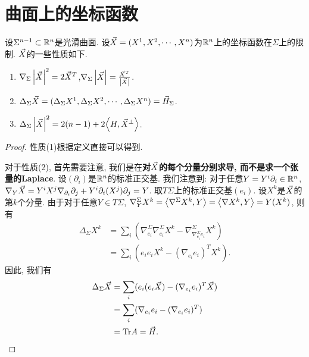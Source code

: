 \section{曲面上的坐标函数}
设$\Sigma^{n-1} \subset \mathbb{R}^n$是光滑曲面. 设${\vec{X}}=(X^1,X^2,\cdots,X^n)$为$\mathbb{R}^n$上的坐标函数在$\Sigma$上的限制. ${\vec{X}}$的一些性质如下.
\begin{enumerate}
    \item $\nabla_\Sigma \left | {\vec{X}} \right |^2=2{\vec{X}}^T$,$\nabla_\Sigma \left | {\vec{X}} \right |=\frac{{\vec{X}}^T}{\left | {\vec{X}} \right |}$.
    \item $\Delta_\Sigma {\vec{X}}=(\Delta_\Sigma X^1, \Delta_\Sigma X^2, \cdots, \Delta_\Sigma X^n)= \vec{H}_\Sigma$.
    \item $\Delta_\Sigma \left | {\vec{X}} \right |^2 = 2(n-1)+2{\left < H, {\vec{X}}^\perp \right >}$.%
\end{enumerate}
\begin{proof}
    性质(1)根据定义直接可以得到.
    \par 对于性质(2), 首先需要注意, 我们是在\textbf{对${\vec{X}}$的每个分量分别求导, 而不是求一个张量的Laplace}.  设$(\partial_i)$是$\mathbb{R}^n$的标准正交基. 我们注意到: 对于任意$Y=Y^i\partial_i \in \mathbb{R}^n$, $\nabla_Y{\vec{X}}=Y^iX^j\nabla_{\partial_i}\partial_j+Y^i\partial_i(X^j)\partial_j=Y$. 取$T\Sigma$上的标准正交基$(e_i)$. 设$X^k$是${\vec{X}}$的第$k$个分量. 由于对于任意$Y \in T\Sigma$, $\nabla^\Sigma_Y X^k= {\left < \nabla^\Sigma X^k, Y \right >} = {\left < \nabla X^k, Y \right >} = Y(X^k)$, 则有
    \begin{equation}
        \begin{split}
            \Delta_\Sigma X^k &= \sum_i (\nabla^\Sigma_{e_i}\nabla^\Sigma_{e_i} X^k -\nabla^\Sigma_{\nabla^\Sigma_{e_i}e_i} X^k) \\
            &= \sum_i(e_ie_i X^k - (\nabla_{e_i}e_i)^T X^k).
        \end{split}
    \end{equation}
    因此, 我们有
    \begin{equation}
        \begin{split}
            \Delta_\Sigma {\vec{X}}  &= \sum_i(e_i(e_i {\vec{X}}) - (\nabla_{e_i}e_i)^T {\vec{X}}) \\
            &= \sum_i(\nabla_{e_i}e_i - (\nabla_{e_i}e_i)^T )\\
            &= \text{Tr} A = \vec{H}.
        \end{split}
    \end{equation}

\end{proof}
